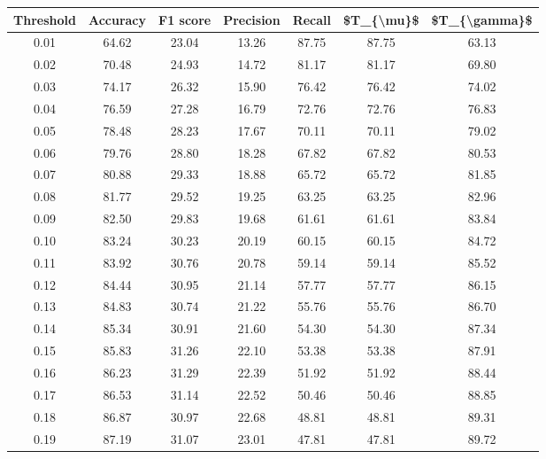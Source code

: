 \begin{tabular}{|c|c|c|c|c|c|c|}
\hline
 Threshold &  Accuracy &  F1 score &  Precision &  Recall &  \$T\_\{\textbackslash mu\}\$ &  \$T\_\{\textbackslash gamma\}\$ \\
\hline
      0.01 &     64.62 &     23.04 &      13.26 &   87.75 &      87.75 &         63.13 \\
      0.02 &     70.48 &     24.93 &      14.72 &   81.17 &      81.17 &         69.80 \\
      0.03 &     74.17 &     26.32 &      15.90 &   76.42 &      76.42 &         74.02 \\
      0.04 &     76.59 &     27.28 &      16.79 &   72.76 &      72.76 &         76.83 \\
      0.05 &     78.48 &     28.23 &      17.67 &   70.11 &      70.11 &         79.02 \\
      0.06 &     79.76 &     28.80 &      18.28 &   67.82 &      67.82 &         80.53 \\
      0.07 &     80.88 &     29.33 &      18.88 &   65.72 &      65.72 &         81.85 \\
      0.08 &     81.77 &     29.52 &      19.25 &   63.25 &      63.25 &         82.96 \\
      0.09 &     82.50 &     29.83 &      19.68 &   61.61 &      61.61 &         83.84 \\
      0.10 &     83.24 &     30.23 &      20.19 &   60.15 &      60.15 &         84.72 \\
      0.11 &     83.92 &     30.76 &      20.78 &   59.14 &      59.14 &         85.52 \\
      0.12 &     84.44 &     30.95 &      21.14 &   57.77 &      57.77 &         86.15 \\
      0.13 &     84.83 &     30.74 &      21.22 &   55.76 &      55.76 &         86.70 \\
      0.14 &     85.34 &     30.91 &      21.60 &   54.30 &      54.30 &         87.34 \\
      0.15 &     85.83 &     31.26 &      22.10 &   53.38 &      53.38 &         87.91 \\
      0.16 &     86.23 &     31.29 &      22.39 &   51.92 &      51.92 &         88.44 \\
      0.17 &     86.53 &     31.14 &      22.52 &   50.46 &      50.46 &         88.85 \\
      0.18 &     86.87 &     30.97 &      22.68 &   48.81 &      48.81 &         89.31 \\
      0.19 &     87.19 &     31.07 &      23.01 &   47.81 &      47.81 &         89.72 \\

\end{tabular}

